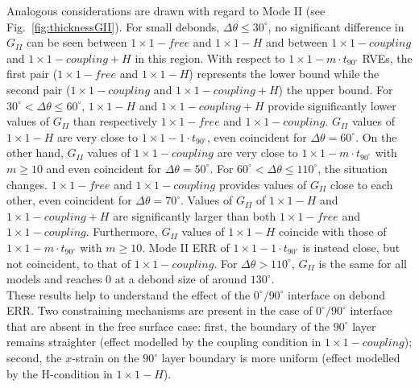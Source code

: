 \documentclass[Review,sagev,times]{sagej}
\begin{document}
Analogous considerations are drawn with regard to Mode II (see Fig.~\ref{fig:thicknessGII}). For small debonds, $\Delta\theta\leq30^{\circ}$, no significant difference in $G_{II}$ can be seen between $1\times 1-free$ and $1\times 1-H$ and between $1\times 1-coupling$ and $1\times 1-coupling+H$ in this region. With respect to $1\times 1-m\cdot t_{90^{\circ}}$ RVEs, the first pair ($1\times 1-free$ and $1\times 1-H$) represents the lower bound while the second pair ($1\times 1-coupling$ and $1\times 1-coupling+H$) the upper bound. For $30^{\circ}<\Delta\theta\leq60^{\circ}$, $1\times 1-H$ and $1\times 1-coupling+H$ provide significantly lower values of $G_{II}$ than respectively $1\times 1-free$ and $1\times 1-coupling$. $G_{II}$ values of $1\times 1-H$ are very close to $1\times 1-1\cdot t_{90^{\circ}}$, even coincident for $\Delta\theta=60^{\circ}$. On the other hand, $G_{II}$ values of $1\times 1-coupling$ are very close to $1\times 1-m\cdot t_{90^{\circ}}$ with $m\geq10$ and even coincident for $\Delta\theta=50^{\circ}$. For $60^{\circ}<\Delta\theta\leq110^{\circ}$, the situation changes. $1\times 1-free$ and $1\times 1-coupling$ provides values of $G_{II}$ close to each other, even coincident for $\Delta\theta=70^{\circ}$. Values of $G_{II}$ of $1\times 1-H$ and $1\times 1-coupling+H$ are significantly larger than both $1\times 1-free$ and $1\times 1-coupling$. Furthermore, $G_{II}$ values of $1\times 1-H$ coincide with those of $1\times 1-m\cdot t_{90^{\circ}}$ with $m\geq10$. Mode II ERR of $1\times 1-1\cdot t_{90^{\circ}}$ is instead close, but not coincident, to that of $1\times 1-coupling$. For $\Delta\theta>110^{\circ}$, $G_{II}$ is the same for all models and reaches $0$ at a debond size of around $130^{\circ}$.\\
These results help to understand the effect of the $0^{\circ}/90^{\circ}$ interface on debond ERR. Two constraining mechanisms are present in the case of $0^{\circ}/90^{\circ}$ interface that are absent in the free surface case: first, the boundary of the $90^{\circ}$ layer remains straighter (effect modelled by the coupling condition in $1\times 1-coupling$); second, the $x$-strain on the $90^{\circ}$ layer boundary is more uniform (effect modelled by the H-condition in $1\times 1-H$).\\
\end{document}
